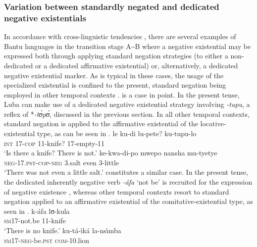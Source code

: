 \documentclass[output=paper]{langscibook}
\begin{document}
\subsubsection{Variation between standardly negated and dedicated negative
existentials}\label{sec:1:5.2.2} In accordance with cross-linguistic
tendencies \citep{Veselinova2016}, there are several examples of Bantu
languages in the transition stage A{\textasciitilde}B where a negative
existential may be expressed both through applying standard negation
strategies (to either a non-dedicated or a dedicated affirmative
existential) or, alternatively, a dedicated negative existential marker. As
is typical in these cases, the usage of the specialized existential is
confined to the present, standard negation being employed in other temporal
contexts \parencites{Veselinova2013}{Veselinova2016}.  is a case in
point. In the present tense, Luba can make use of a dedicated negative
existential strategy involving \textit{-tupu}, a reflex of
*\textit{-t{\'ʊ}p{\'ʊ}}, discussed in the previous section. In all other
temporal contexts, standard negation is applied to the affirmative
existential of the locative-existential type, as can be seen in
.  \ea\label{ex:luba-knife-salt}
 \ea\gll le ku-di
lu-pete? ku-tupu-lo\\ \textsc{int} 17-\textsc{cop} 11-knife? 17-empty-11\\
\glt 	`Is there a knife? There is not.' \ex\gll ke-kwa-di-po mwepo nansha
mu-tyetye\\ \textsc{neg-17.pst-cop-neg} 3.salt even 3-little\\ \glt
`There was not even a little salt.' \z\z {} constitutes a similar
case. In the present tense, the dedicated inherently negative verb
\textit{-{\'a}fa} `not be' is recruited for the expression of negative
existence , whereas other temporal contexts resort to
standard negation applied to an affirmative existential of the
comitative-existential type, as seen in .
\ea\label{ex:ombo-knife-lion}  \ea\label{ex:ombo-knife} \gll k-{\'a}fa
lʊ-kula\\ \textsc{sm}17-not.be 11-knife\\ \glt 	`There is no knife.'
\ex\label{ex:ombo-lion} \gll ku-t{\'a}-{\'\i}k{\'a} la-ns{\'\i}mba\\
\textsc{sm}17-\textsc{neg}-be.\textsc{pst} \textsc{com}-10.lion\\ \glt
\end{document}
